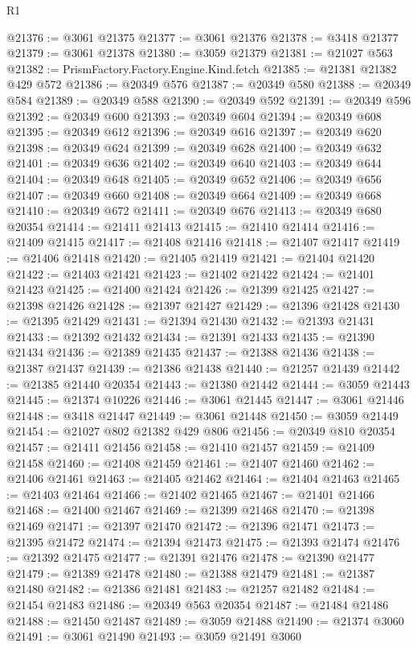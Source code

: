 \begin{lexlean}{R1}
\begin{coremodule}
@21376 := @3061 @21375
@21377 := @3061 @21376
@21378 := @3418 @21377
@21379 := @3061 @21378
@21380 := @3059 @21379
@21381 := @21027 @563
@21382 := PrismFactory.Factory.Engine.Kind.fetch
@21385 := @21381 @21382 @429 @572
@21386 := @20349 @576
@21387 := @20349 @580
@21388 := @20349 @584
@21389 := @20349 @588
@21390 := @20349 @592
@21391 := @20349 @596
@21392 := @20349 @600
@21393 := @20349 @604
@21394 := @20349 @608
@21395 := @20349 @612
@21396 := @20349 @616
@21397 := @20349 @620
@21398 := @20349 @624
@21399 := @20349 @628
@21400 := @20349 @632
@21401 := @20349 @636
@21402 := @20349 @640
@21403 := @20349 @644
@21404 := @20349 @648
@21405 := @20349 @652
@21406 := @20349 @656
@21407 := @20349 @660
@21408 := @20349 @664
@21409 := @20349 @668
@21410 := @20349 @672
@21411 := @20349 @676
@21413 := @20349 @680 @20354
@21414 := @21411 @21413
@21415 := @21410 @21414
@21416 := @21409 @21415
@21417 := @21408 @21416
@21418 := @21407 @21417
@21419 := @21406 @21418
@21420 := @21405 @21419
@21421 := @21404 @21420
@21422 := @21403 @21421
@21423 := @21402 @21422
@21424 := @21401 @21423
@21425 := @21400 @21424
@21426 := @21399 @21425
@21427 := @21398 @21426
@21428 := @21397 @21427
@21429 := @21396 @21428
@21430 := @21395 @21429
@21431 := @21394 @21430
@21432 := @21393 @21431
@21433 := @21392 @21432
@21434 := @21391 @21433
@21435 := @21390 @21434
@21436 := @21389 @21435
@21437 := @21388 @21436
@21438 := @21387 @21437
@21439 := @21386 @21438
@21440 := @21257 @21439
@21442 := @21385 @21440 @20354
@21443 := @21380 @21442
@21444 := @3059 @21443
@21445 := @21374 @10226
@21446 := @3061 @21445
@21447 := @3061 @21446
@21448 := @3418 @21447
@21449 := @3061 @21448
@21450 := @3059 @21449
@21454 := @21027 @802 @21382 @429 @806
@21456 := @20349 @810 @20354
@21457 := @21411 @21456
@21458 := @21410 @21457
@21459 := @21409 @21458
@21460 := @21408 @21459
@21461 := @21407 @21460
@21462 := @21406 @21461
@21463 := @21405 @21462
@21464 := @21404 @21463
@21465 := @21403 @21464
@21466 := @21402 @21465
@21467 := @21401 @21466
@21468 := @21400 @21467
@21469 := @21399 @21468
@21470 := @21398 @21469
@21471 := @21397 @21470
@21472 := @21396 @21471
@21473 := @21395 @21472
@21474 := @21394 @21473
@21475 := @21393 @21474
@21476 := @21392 @21475
@21477 := @21391 @21476
@21478 := @21390 @21477
@21479 := @21389 @21478
@21480 := @21388 @21479
@21481 := @21387 @21480
@21482 := @21386 @21481
@21483 := @21257 @21482
@21484 := @21454 @21483
@21486 := @20349 @563 @20354
@21487 := @21484 @21486
@21488 := @21450 @21487
@21489 := @3059 @21488
@21490 := @21374 @3060
@21491 := @3061 @21490
@21493 := @3059 @21491 @3060

\end{coremodule}
\end{lexlean}
